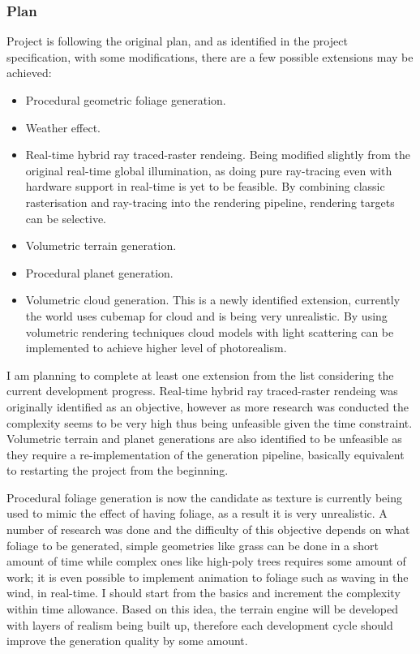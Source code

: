 \documentclass[oneside, a4paper]{article}
\begin{document}

    \subsubsection{Plan}

    Project is following the original plan, and as identified in the project specification, with some modifications, there are a few possible extensions may be achieved:

    \begin{itemize}[label=\(\diamond\)]
        \item Procedural geometric foliage generation.
        \item Weather effect.
        \item Real-time hybrid ray traced-raster rendeing. Being modified slightly from the original real-time global illumination, as doing pure ray-tracing even with hardware support in real-time is yet to be feasible. By combining classic rasterisation and ray-tracing into the rendering pipeline, rendering targets can be selective.
        \item Volumetric terrain generation.
        \item Procedural planet generation.
        \item Volumetric cloud generation. This is a newly identified extension, currently the world uses cubemap for cloud and is being very unrealistic. By using volumetric rendering techniques cloud models with light scattering can be implemented to achieve higher level of photorealism.
    \end{itemize}

    I am planning to complete at least one extension from the list considering the current development progress. Real-time hybrid ray traced-raster rendeing was originally identified as an objective, however as more research was conducted the complexity seems to be very high thus being unfeasible given the time constraint. Volumetric terrain and planet generations are also identified to be unfeasible as they require a re-implementation of the generation pipeline, basically equivalent to restarting the project from the beginning.

    Procedural foliage generation is now the candidate as texture is currently being used to mimic the effect of having foliage, as a result it is very unrealistic. A number of research was done and the difficulty of this objective depends on what foliage to be generated, simple geometries like grass can be done in a short amount of time while complex ones like high-poly trees requires some amount of work; it is even possible to implement animation to foliage such as waving in the wind, in real-time. I should start from the basics and increment the complexity within time allowance. Based on this idea, the terrain engine will be developed with layers of realism being built up, therefore each development cycle should improve the generation quality by some amount.
\end{document}
